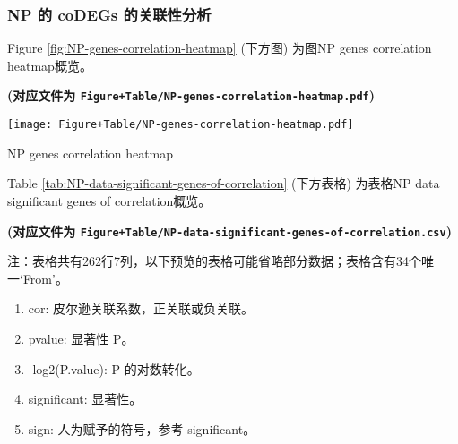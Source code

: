 \documentclass[
]{article}
\providecommand{\tightlist}{%
  \setlength{\itemsep}{0pt}\setlength{\parskip}{0pt}}
\begin{document}
\hypertarget{np-ux7684-codegs-ux7684ux5173ux8054ux6027ux5206ux6790}{%
\subsubsection{NP 的 coDEGs 的关联性分析}\label{np-ux7684-codegs-ux7684ux5173ux8054ux6027ux5206ux6790}}

Figure \ref{fig:NP-genes-correlation-heatmap} (下方图) 为图NP genes correlation heatmap概览。

\textbf{(对应文件为 \texttt{Figure+Table/NP-genes-correlation-heatmap.pdf})}

\def\@captype{figure}
\begin{center}
\texttt{[image: Figure+Table/NP-genes-correlation-heatmap.pdf]}
\caption{NP genes correlation heatmap}\label{fig:NP-genes-correlation-heatmap}
\end{center}

Table \ref{tab:NP-data-significant-genes-of-correlation} (下方表格) 为表格NP data significant genes of correlation概览。

\textbf{(对应文件为 \texttt{Figure+Table/NP-data-significant-genes-of-correlation.csv})}

\begin{center}\begin{tcolorbox}[colback=gray!10, colframe=gray!50, width=0.9\linewidth, arc=1mm, boxrule=0.5pt]注：表格共有262行7列，以下预览的表格可能省略部分数据；表格含有34个唯一`From'。
\end{tcolorbox}
\end{center}
\begin{center}\begin{tcolorbox}[colback=gray!10, colframe=gray!50, width=0.9\linewidth, arc=1mm, boxrule=0.5pt]\begin{enumerate}\tightlist
\item cor: 皮尔逊关联系数，正关联或负关联。
\item pvalue: 显著性 P。
\item -log2(P.value): P 的对数转化。
\item significant: 显著性。
\item sign: 人为赋予的符号，参考 significant。
\end{enumerate}\end{tcolorbox}
\end{center}
\end{document}
